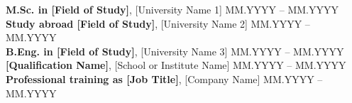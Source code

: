 \newcommand{\educationitem}[3]{%
  \textbf{#1}#2 \hfill #3\\
}
\educationitem{M.Sc. in [Field of Study]}{, [University Name 1]}{MM.YYYY – MM.YYYY}
\educationitem{Study abroad [Field of Study]}{, [University Name 2]}{MM.YYYY – MM.YYYY}
\educationitem{B.Eng. in [Field of Study]}{, [University Name 3]}{MM.YYYY – MM.YYYY}
\educationitem{[Qualification Name]}{, [School or Institute Name]}{MM.YYYY – MM.YYYY}
\educationitem{Professional training as [Job Title]}{, [Company Name]}{MM.YYYY – MM.YYYY}
